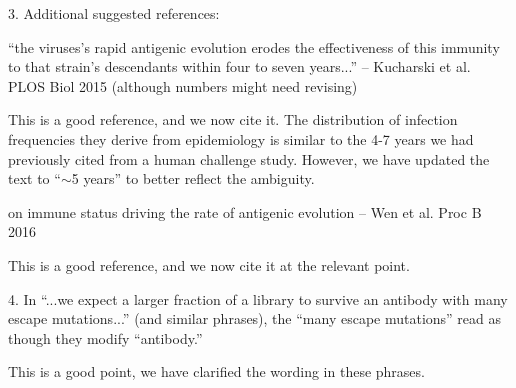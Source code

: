 \documentclass[11pt, oneside]{article}   	%
\begin{document}
3. Additional suggested references: 

``the viruses's rapid antigenic evolution erodes the effectiveness of this immunity to that strain's descendants within four to seven years...'' -- Kucharski et al. PLOS Biol 2015 (although numbers might need revising)

{\color{black}
This is a good reference, and we now cite it.
The distribution of infection frequencies they derive from epidemiology is similar to the 4-7 years we had previously cited from a human challenge study.
However, we have updated the text to ``$\sim$5 years'' to better reflect the ambiguity.}

on immune status driving the rate of antigenic evolution -- Wen et al. Proc B 2016

{\color{black}
This is a good reference, and we now cite it at the relevant point.}

4. In ``...we expect a larger fraction of a library to survive an antibody with many escape mutations...'' (and similar phrases), the ``many escape mutations'' read as though they modify ``antibody.''

{\color{black}
This is a good point, we have clarified the wording in these phrases.}
\end{document}
